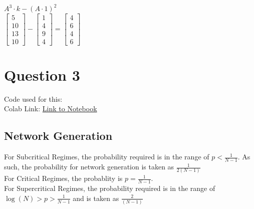 \documentclass[11pt]{article}
\begin{document}
$A^3 \cdot k - (A\cdot1)^2$ \\

$
\begin{bmatrix}
5 \\
10 \\
13 \\
10
\end{bmatrix}
-
\begin{bmatrix}
    1 \\
    4 \\
    9 \\ 
    4
\end{bmatrix}
=
\begin{bmatrix}
    4\\
    6\\
    4\\
    6
\end{bmatrix}
$

\section{Question 3}
Code used for this:\\ 
Colab Link: \href{https://colab.research.google.com/drive/1ZiCxfnfzeQLUYKbacRC6YViKvvSxXons?usp=sharing}{Link to Notebook} \\

\subsection{Network Generation}

For Subcritical Regimes, the probability required is in the range of $p < \frac{1}{N-1}$. As such, the probability for network generation is taken as $\frac{1}{2 (N-1)}$ \\
For Critical Regimes, the probablity is $p = \frac{1}{N-1}$. \\
For Supercritical Regimes, the probability required is in the range of $ \log(N) > p > \frac{1}{N-1}$ and is taken as $\frac{2}{(N-1)}$ 
\end{document}
